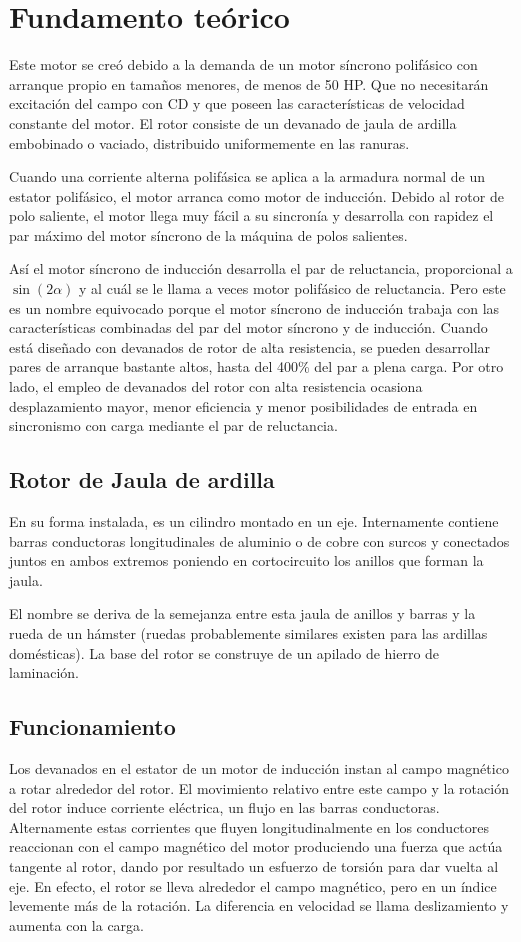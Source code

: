 \documentclass[a4paper,11pt]{article}
\begin{document}
\section{Fundamento teórico}
Este motor se creó debido a la demanda de un motor síncrono polifásico con arranque propio en tamaños menores, de menos de 50 HP. Que no necesitarán excitación del campo con CD y que poseen las características de velocidad constante del motor. El rotor consiste de un devanado de jaula de ardilla embobinado o vaciado, distribuido uniformemente en las ranuras.

Cuando una corriente alterna polifásica se aplica a la armadura normal de un estator polifásico, el motor arranca como motor de inducción. Debido al rotor de polo saliente, el motor llega muy fácil a su sincronía y desarrolla con rapidez el par máximo del motor síncrono de la máquina de polos salientes.

Así el motor síncrono de inducción desarrolla el par de reluctancia, proporcional a $\sin(2\alpha)$ y al cuál se le llama a veces motor polifásico de reluctancia. Pero este es un nombre equivocado porque el motor síncrono de inducción trabaja con las características combinadas del par del motor síncrono y de inducción. Cuando está diseñado con devanados de rotor de alta resistencia, se pueden desarrollar pares de arranque bastante altos, hasta del 400\% del par a plena carga. Por otro lado, el empleo de devanados del rotor con alta resistencia ocasiona desplazamiento mayor, menor eficiencia y menor posibilidades de entrada en sincronismo con carga mediante el par de reluctancia.
\subsection{Rotor de Jaula de ardilla}
En su forma instalada, es un cilindro montado en un eje. Internamente contiene barras conductoras longitudinales de aluminio o de cobre con surcos y conectados juntos en ambos extremos poniendo en cortocircuito los anillos que forman la jaula.

El nombre se deriva de la semejanza entre esta jaula de anillos y barras y la rueda de un hámster (ruedas probablemente similares existen para las ardillas domésticas). La base del rotor se construye de un apilado de hierro de laminación.
\subsection{Funcionamiento}
Los devanados en el estator de un motor de inducción instan al campo magnético a rotar alrededor del rotor. El movimiento relativo entre este campo y la rotación del rotor induce corriente eléctrica, un flujo en las barras conductoras. Alternamente estas corrientes que fluyen longitudinalmente en los conductores reaccionan con el campo magnético del motor produciendo una fuerza que actúa tangente al rotor, dando por resultado un esfuerzo de torsión para dar vuelta al eje. En efecto, el rotor se lleva alrededor el campo magnético, pero en un índice levemente más de la rotación. La diferencia en velocidad se llama deslizamiento y aumenta con la carga.
\end{document}
